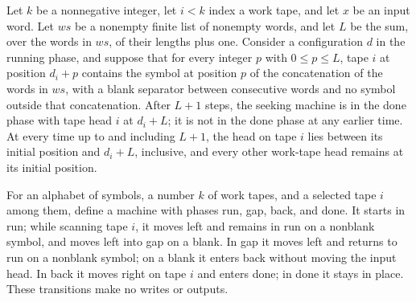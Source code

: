 \begin{theorem}
\label{Turing.seekEndTM_run_ofCfg}
\leanok
{}
Let $k$ be a nonnegative integer, let $i<k$ index a work tape, and let $x$ be an input
word. Let $ws$ be a nonempty finite list of nonempty words, and let $L$ be the sum, over
the words in $ws$, of their lengths plus one. Consider a configuration $d$ in the
running phase, and suppose that for every integer $p$ with $0\le p\le L$, tape $i$ at
position $d_i+p$ contains the symbol at position $p$ of the concatenation of the words
in $ws$, with a blank separator between consecutive words and no symbol outside that
concatenation. After $L+1$ steps, the seeking machine is in the done phase with tape
head $i$ at $d_i+L$; it is not in the done phase at any earlier time. At every time up
to and including $L+1$, the head on tape $i$ lies between its initial position and
$d_i+L$, inclusive, and every other work-tape head remains at its initial position.
\end{theorem}

\begin{definition}
\label{Turing.seekStartTM}
\leanok
{}
For an alphabet of symbols, a number $k$ of work tapes, and a selected tape $i$ among
them, define a machine with phases run, gap, back, and done. It starts in run; while
scanning tape $i$, it moves left and remains in run on a nonblank symbol, and moves left
into gap on a blank. In gap it moves left and returns to run on a nonblank symbol; on a
blank it enters back without moving the input head. In back it moves right on tape $i$
and enters done; in done it stays in place. These transitions make no writes or outputs.
\end{definition}

